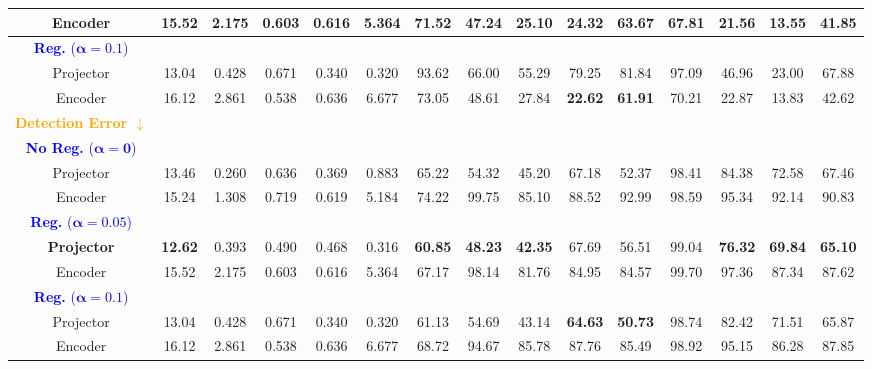 \begin{table*}[t]
{\begin{tabular}{cc|cccc|ccccccccc}
    \rowcolor{yellow!50}
    \textbf{Encoder} & 15.52 & 2.175 & 0.603 & 0.616 & 5.364 & \textbf{71.52} & \textbf{47.24} & \textbf{25.10} & 24.32 & 63.67 & \textbf{67.81} & \textbf{21.56} & \textbf{13.55} & \textbf{41.85} \\ %

    \hline
    \textcolor{blue}{\textbf{Reg.} ($\mathbf{\alpha=0.1}$)} \\
    Projector & 13.04 & 0.428 & 0.671 & 0.340 & 0.320 & 93.62 & 66.00 & 55.29 & 79.25 & 81.84 & 97.09 & 46.96 & 23.00 & 67.88 \\

    \rowcolor{yellow!50}
    Encoder & 16.12 & 2.861 & 0.538 & 0.636 & 6.677 & 73.05 & 48.61 & 27.84 & \textbf{22.62} & \textbf{61.91} & 70.21 & 22.87 & 13.83 & 42.62 \\
    
    \hline \hline
    \textbf{\textcolor{orange}{Detection Error $\downarrow$}} \\
    \textcolor{blue}{\textbf{No Reg.} ($\mathbf{\alpha=0}$)} \\
    \rowcolor{green!25}
    Projector & 13.46 & 0.260 & 0.636 & 0.369 & 0.883 & 65.22 & 54.32 & 45.20 & 67.18 & 52.37 & 98.41 & 84.38 & 72.58 & 67.46 \\
    
    Encoder & 15.24 & 1.308 & 0.719 & 0.619 & 5.184 & 74.22 & 99.75 & 85.10 & 88.52 & 92.99 & 98.59 & 95.34 & 92.14 & 90.83 \\
    \hline
    \textcolor{blue}{\textbf{Reg.} ($\mathbf{\alpha=0.05}$)} \\
    \rowcolor{green!25}
    \textbf{Projector} & \textbf{12.62} & 0.393 & 0.490 & 0.468 & 0.316 & \textbf{60.85} & \textbf{48.23} & \textbf{42.35} & 67.69 & 56.51 & 99.04 & \textbf{76.32} & \textbf{69.84} & \textbf{65.10} \\
    
    Encoder & 15.52 & 2.175 & 0.603 & 0.616 & 5.364 & 67.17 & 98.14 & 81.76 & 84.95 & 84.57 & 99.70 & 97.36 & 87.34 & 87.62 \\

    \hline
    \textcolor{blue}{\textbf{Reg.} ($\mathbf{\alpha=0.1}$)} \\
    \rowcolor{green!25}
    Projector & 13.04 & 0.428 & 0.671 & 0.340 & 0.320 & 61.13 & 54.69 & 43.14 & \textbf{64.63} & \textbf{50.73} & 98.74 & 82.42 & 71.51 & 65.87 \\

    Encoder & 16.12 & 2.861 & 0.538 & 0.636 & 6.677 & 68.72 & 94.67 & 85.78 & 87.76 & 85.49 & 98.92 & 95.15 & 86.28 & 87.85 \\
    
    \bottomrule
    \end{tabular}}
\end{table*}
